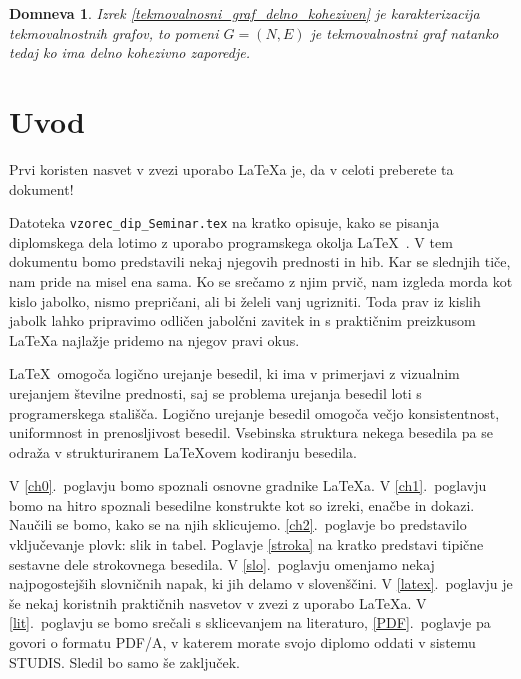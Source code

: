 \documentclass[a4paper, 12pt]{book}
\newtheorem{domneva}{Domneva}[izrek]
\begin{document}
\begin{domneva}
    Izrek \ref{tekmovalnosni_graf_delno_koheziven} je karakterizacija tekmovalnostnih grafov, to pomeni $G = (N, E)$ je tekmovalnostni graf natanko tedaj ko ima delno kohezivno zaporedje.
\end{domneva}




















\chapter{Uvod}
Prvi koristen nasvet v zvezi uporabo \LaTeX{a} je, da v celoti preberete ta dokument!

Datoteka {\tt vzorec\_dip\_Seminar.tex} na kratko opisuje, kako se pisanja diplomskega dela lotimo z uporabo programskega okolja \LaTeX~\cite{lamport,nenajkrajsi}. 
V tem dokumentu bomo predstavili nekaj njegovih prednosti in hib. 
Kar se slednjih tiče, nam pride na misel ena sama. 
Ko se srečamo z njim prvič, nam izgleda morda kot kislo jabolko, nismo prepričani, ali bi želeli vanj ugrizniti. 
Toda prav iz kislih jabolk lahko pripravimo odličen jabolčni zavitek in s praktičnim preizkusom \LaTeX a najlažje pridemo na njegov pravi okus.

\LaTeX\ omogoča logično urejanje besedil, ki ima v primerjavi z vizualnim urejanjem številne prednosti, saj se problema urejanja besedil loti s programerskega stališča.
Logično urejanje besedil omogoča večjo konsistentnost, uniformnost in  prenosljivost besedil. 
Vsebinska struktura nekega besedila pa se odraža v strukturiranem \LaTeX ovem kodiranju besedila.

V \ref{ch0}.~poglavju bomo spoznali osnovne gradnike \LaTeX{a}.
V \ref{ch1}.~poglavju bomo na hitro spoznali besedilne konstrukte kot so izreki, enačbe in dokazi. 
Naučili se bomo, kako se na njih sklicujemo. 
\ref{ch2}.~poglavje bo predstavilo vključevanje plovk: slik in tabel. 
Poglavje \ref{stroka} na kratko predstavi tipične sestavne dele strokovnega besedila.
V \ref{slo}.~poglavju omenjamo nekaj najpogostejših slovničnih napak, ki jih delamo v slovenščini.
V \ref{latex}.~poglavju je še nekaj koristnih praktičnih nasvetov v zvezi z uporabo \LaTeX{a}.
V \ref{lit}.~poglavju se bomo srečali s sklicevanjem na literaturo,
\ref{PDF}.~poglavje pa govori o formatu PDF/A, v katerem morate svojo diplomo oddati v sistemu STUDIS.
Sledil bo samo še zaključek.
\end{document}
